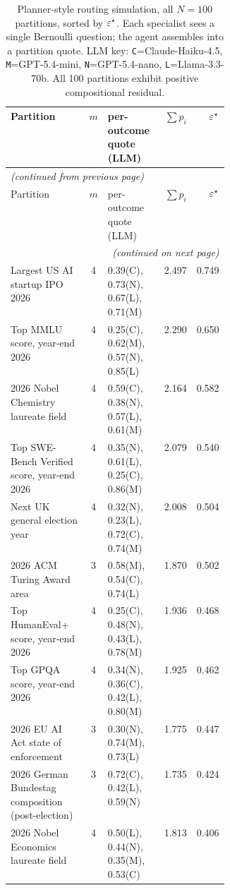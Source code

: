 \begin{longtable}{p{0.36\linewidth} c l r r}
\caption{Planner-style routing simulation, all $N{=}100$ partitions, sorted by $\varepsilon^\star$. Each specialist sees a single Bernoulli question; the agent assembles into a partition quote. LLM key: \texttt{C}=Claude-Haiku-4.5, \texttt{M}=GPT-5.4-mini, \texttt{N}=GPT-5.4-nano, \texttt{L}=Llama-3.3-70b. All 100 partitions exhibit positive compositional residual.}\label{tab:realagent}\\
\toprule
Partition & $m$ & per-outcome quote (LLM) & $\sum p_i$ & $\varepsilon^\star$ \\
\midrule
\endfirsthead
\multicolumn{5}{l}{\small \emph{(continued from previous page)}}\\
\toprule
Partition & $m$ & per-outcome quote (LLM) & $\sum p_i$ & $\varepsilon^\star$ \\
\midrule
\endhead
\midrule
\multicolumn{5}{r}{\small \emph{(continued on next page)}}\\
\endfoot
\bottomrule
\endlastfoot
Largest US AI startup IPO 2026 & 4 & \scriptsize 0.39(C), 0.73(N), 0.67(L), 0.71(M) & 2.497 & 0.749 \\
Top MMLU score, year-end 2026 & 4 & \scriptsize 0.25(C), 0.62(M), 0.57(N), 0.85(L) & 2.290 & 0.650 \\
2026 Nobel Chemistry laureate field & 4 & \scriptsize 0.59(C), 0.38(N), 0.57(L), 0.61(M) & 2.164 & 0.582 \\
Top SWE-Bench Verified score, year-end 2026 & 4 & \scriptsize 0.35(N), 0.61(L), 0.25(C), 0.86(M) & 2.079 & 0.540 \\
Next UK general election year & 4 & \scriptsize 0.32(N), 0.23(L), 0.72(C), 0.74(M) & 2.008 & 0.504 \\
2026 ACM Turing Award area & 3 & \scriptsize 0.58(M), 0.54(C), 0.74(L) & 1.870 & 0.502 \\
Top HumanEval+ score, year-end 2026 & 4 & \scriptsize 0.25(C), 0.48(N), 0.43(L), 0.78(M) & 1.936 & 0.468 \\
Top GPQA score, year-end 2026 & 4 & \scriptsize 0.34(N), 0.36(C), 0.42(L), 0.80(M) & 1.925 & 0.462 \\
2026 EU AI Act state of enforcement & 3 & \scriptsize 0.30(N), 0.74(M), 0.73(L) & 1.775 & 0.447 \\
2026 German Bundestag composition (post-election) & 3 & \scriptsize 0.72(C), 0.42(L), 0.59(N) & 1.735 & 0.424 \\
2026 Nobel Economics laureate field & 4 & \scriptsize 0.50(L), 0.44(N), 0.35(M), 0.53(C) & 1.813 & 0.406 \\

\end{longtable}

